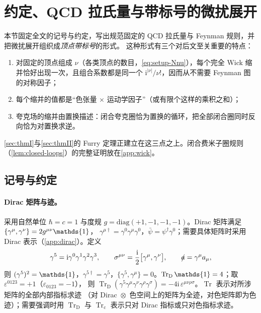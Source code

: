 \documentclass[UTF8,a4paper,11pt,fontset=fandol]{ctexart}
\let\amsmathbb\mathbb
\renewcommand{\mathbb}[1]{\ifx1#1\mathds{1}\else\amsmathbb{#1}\fi}
\theoremstyle{cplain}
\theoremstyle{cdefinition}
\theoremstyle{cremark}
\numberwithin{equation}{section}
\DeclareMathOperator{\Tr}{Tr}
\newcommand{\TrD}{\operatorname{Tr}_{\mathrm{D}}}   %
\newcommand{\Trc}{\operatorname{Tr}_{\mathrm{c}}}   %
\newcommand{\sla}[1]{\slashed{#1}}                  %
\newcommand{\ii}{\mathrm{i}}                        %
\begin{document}
\section{约定、QCD 拉氏量与带标号的微扰展开}\label{sec:setup}

本节固定全文的记号与约定，写出规范固定的 QCD 拉氏量与 Feynman 规则，并把微扰展开组织成\emph{顶点带标号}的形式。
这种形式有三个对后文至关重要的特点：
\begin{enumerate}[label=(\roman*),leftmargin=2.2em,itemsep=0pt,topsep=2pt]
\item 对固定的顶点组成 $\nu$（各类顶点的数目，\cref{eq:setup-Nnu}），每个完全 Wick 缩并恰好出现一次，且组合系数都是同一个 $\ii^{|\nu|}/\nu!$，因而从不需要 Feynman 图的对称因子；
\item 每个缩并的值都是“色张量 $\times$ 运动学因子”（或有限个这样的乘积之和）；
\item 夸克场的缩并由置换描述：闭合夸克圈恰为置换的循环，把全部闭合圈同时反向恰为对置换求逆。
\end{enumerate}
\cref{sec:thmI}与\cref{sec:thmII}的 Furry 定理正建立在这三点之上。闭合费米子圈规则（\cref{lem:closed-loops}）的完整证明放在\cref{app:wick}。

\subsection{记号与约定}\label{sec:setup-notation}

\paragraph{Dirac 矩阵与迹。}
采用自然单位 $\hbar=c=1$ 与度规 $g=\mathrm{diag}(+1,-1,-1,-1)$。Dirac 矩阵满足 $\{\gamma^\mu,\gamma^\nu\}=2g^{\mu\nu}\mathbb 1$，
$\gamma^{\mu\dagger}=\gamma^0\gamma^\mu\gamma^0$，$\bar\psi=\psi^\dagger\gamma^0$；需要具体矩阵时采用 Dirac 表示（\cref{app:dirac}）。定义
\begin{equation}\label{eq:setup-gamma5}
\gamma^5=\ii\gamma^0\gamma^1\gamma^2\gamma^3,\qquad
\sigma^{\mu\nu}=\frac{\ii}{2}\bigl[\gamma^\mu,\gamma^\nu\bigr],\qquad
\sla a=\gamma^\mu a_\mu ,
\end{equation}
则 $(\gamma^5)^2=\mathbb 1$，$\gamma^{5\dagger}=\gamma^5$，$\{\gamma^5,\gamma^\mu\}=0$。$\TrD\mathbb 1=4$；取 $\varepsilon^{0123}=+1$（$\varepsilon_{0123}=-1$），
则 $\TrD(\gamma^5\gamma^\mu\gamma^\nu\gamma^\rho\gamma^\sigma)=-4\ii\,\varepsilon^{\mu\nu\rho\sigma}$。$\Tr$ 表示对所涉矩阵的全部内部指标求迹
（对 Dirac~$\otimes$~色空间上的矩阵为全迹，对色矩阵即为色迹）；需要强调时用 $\TrD$ 与 $\Trc$ 表示只对 Dirac 指标或只对色指标求迹。
\end{document}

